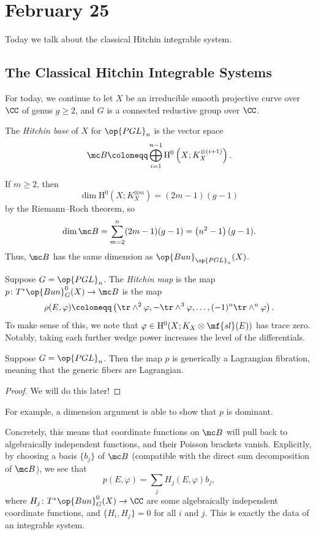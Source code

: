 \documentclass[../notes.tex]{subfiles}
\begin{document}
\section{February 25}
Today we talk about the classical Hitchin integrable system.

\subsection{The Classical Hitchin Integrable Systems}
For today, we continue to let $X$ be an irreducible smooth projective curve over $\CC$ of genus $g\ge2$, and $G$ is a connected reductive group over $\CC$.
\begin{definition}
	The \textit{Hitchin base} of $X$ for $\op{PGL}_n$ is the vector space
	\[\mc B\coloneqq\bigoplus_{i=1}^{n-1}\mathrm H^0\left(X;K_X^{\otimes (i+1)}\right).\]
\end{definition}
\begin{remark}
	If $m\ge2$, then
	\[\dim\mathrm H^0\left(X;K_X^{\otimes m}\right)=(2m-1)(g-1)\]
	by the Riemann--Roch theorem, so
	\[\dim\mc B=\sum_{m=2}^n(2m-1)(g-1)=\left(n^2-1\right)(g-1).\]
	Thus, $\mc B$ has the same dimension as $\op{Bun}_{\op{PGL}_n}(X)$.
\end{remark}
\begin{definition}
	Suppose $G=\op{PGL}_n$. The \textit{Hitchin map} is the map $p\colon T^*\op{Bun}_G^0(X)\to\mc B$ is the map
	\[\rho(E,\varphi)\coloneqq\left(\tr\land^2\varphi,-\tr\land^3\varphi,\ldots,(-1)^n\tr\land^n\varphi\right).\]
	To make sense of this, we note that $\varphi\in\mathrm H^0(X;K_X\otimes\mf{sl}(E))$ has trace zero. Notably, taking each further wedge power increases the level of the differentials.
\end{definition}
\begin{theorem}[Hitchin] \label{thm:hitchin}
	Suppose $G=\op{PGL}_n$. Then the map $p$ is generically a Lagrangian fibration, meaning that the generic fibers are Lagrangian.
\end{theorem}
\begin{proof}
	We will do this later!
\end{proof}
\begin{remark}
	For example, a dimension argument is able to show that $p$ is dominant.
\end{remark}
\begin{remark}
	Concretely, this means that coordinate functions on $\mc B$ will pull back to algebraically independent functions, and their Poisson brackets vanish. Explicitly, by choosing a basis $\{b_j\}$ of $\mc B$ (compatible with the direct sum decomposition of $\mc B$), we see that
	\[p(E,\varphi)=\sum_jH_j(E,\varphi)b_j,\]
	where $H_j\colon T^*\op{Bun}_G^0(X)\to\CC$ are some algebraically independent coordinate functions, and $\{H_i,H_j\}=0$ for all $i$ and $j$. This is exactly the data of an integrable system.
\end{remark}
\end{document}
